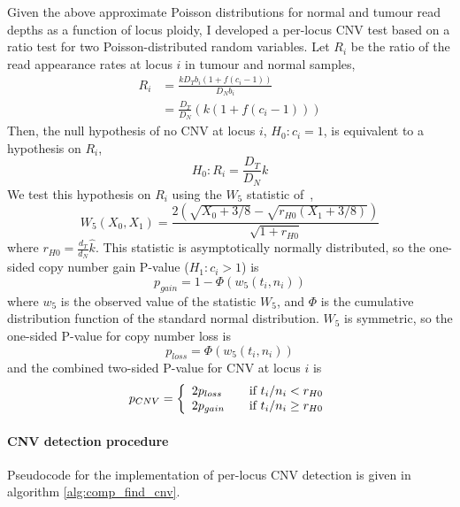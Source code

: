 \documentclass[dissertation.tex]{subfiles}
\begin{document}
Given the above approximate Poisson distributions for normal and tumour read depths as a function of locus ploidy, I developed a per-locus \gls{CNV} test based on a ratio test for two Poisson-distributed random variables.  Let $R_i$ be the ratio of the read appearance rates at locus $i$ in tumour and normal samples, 
\begin{align}
  R_i &= \frac{k D_T b_i \left( 1 + f \left(c_i - 1\right) \right)}{D_N b_i} \\
      &= \frac{D_T}{D_N} \left( k \left( 1 + f \left( c_i - 1 \right)\right) \right)
\end{align}
Then, the null hypothesis of no \gls{CNV} at locus $i$, $H_0: c_i = 1$, is equivalent to a hypothesis on $R_i$, 
\begin{equation}
H_0: R_i = \frac{D_T}{D_N}k
\end{equation}
We test this hypothesis on $R_i$ using the $W_5$ statistic of~\cite{Gu2008},
\begin{equation}
  W_5(X_0, X_1) = \frac{2\left(\sqrt{X_0 + 3/8} - \sqrt{r_{H0}\left(X_1 + 3/8\right)}\right)}{\sqrt{1 + r_{H0}}}
\end{equation}
where $r_{H0} = \frac{d_T}{d_N}\hat{k}$.  This statistic is asymptotically normally distributed, so the one-sided copy number gain P-value ($H_1: c_i > 1$) is
\begin{equation}
  p_{gain} = 1 - \Phi\left(w_5(t_i, n_i)\right)
\end{equation}
where $w_5$ is the observed value of the statistic $W_5$, and $\Phi$ is the cumulative distribution function of the standard normal distribution.  $W_5$ is symmetric, so the one-sided P-value for copy number loss is
\begin{equation}
  p_{loss} = \Phi\left(w_5(t_i, n_i)\right)
\end{equation}
and the combined two-sided P-value for \gls{CNV} at locus $i$ is
\begin{equation}
  p_{CNV} = \left\{ 
    \begin{array}{l l}
      2 p_{loss} & \quad \text{if $t_i/n_i < r_{H0}$} \\
      2 p_{gain} & \quad \text{if $t_i/n_i \geq r_{H0}$}
    \end{array}
  \right.
\end{equation}

\paragraph{\Acrshort{CNV} detection procedure}
Pseudocode for the implementation of per-locus \gls{CNV} detection is given in algorithm \ref{alg:comp_find_cnv}.  
\end{document}
